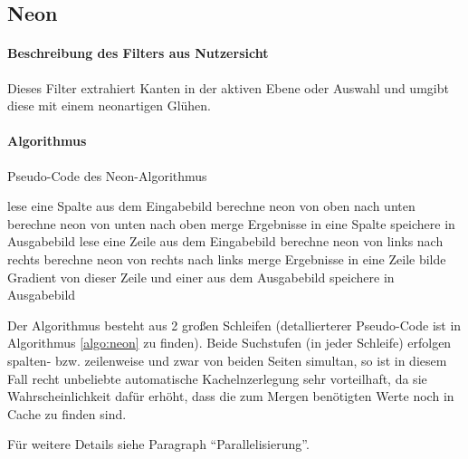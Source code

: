 \newpage
\subsection{Neon}

\paragraph{Beschreibung des Filters aus Nutzersicht}
Dieses Filter extrahiert Kanten in der aktiven Ebene oder Auswahl und 
umgibt diese mit einem neonartigen Glühen.








\paragraph{Algorithmus} 
\begin{algorithm}[h]
\caption{Pseudo-Code des \glqq Neon\grqq-Algorithmus}
\label{algo:neon}
\begin{algorithmic}[1]
	\State lese eine Spalte aus dem Eingabebild
		\State berechne neon von oben nach unten
	\EndFor
		\State berechne neon von unten nach oben
	\EndFor
	\State merge Ergebnisse in eine Spalte
	\State speichere in Ausgabebild
\EndFor	
{}
	\State lese eine Zeile aus dem Eingabebild
		\State berechne neon von links nach rechts
	\EndFor
		\State berechne neon von rechts nach links
	\EndFor	
	\State merge Ergebnisse in eine Zeile
	\State \label{neon_datenabhaengigkeit} bilde Gradient von dieser Zeile und einer aus dem Ausgabebild
	\State speichere in Ausgabebild
\EndFor
\end{algorithmic}
\end{algorithm}

Der Algorithmus besteht aus 2 großen Schleifen (detallierterer Pseudo-Code 
ist in Algorithmus \ref{algo:neon} zu finden).
Beide Suchstufen (in jeder Schleife) erfolgen spalten- bzw. zeilenweise und zwar von beiden Seiten simultan,
so ist in diesem Fall recht unbeliebte automatische Kachelnzerlegung sehr vorteilhaft, da sie Wahrscheinlichkeit dafür erhöht, dass die zum Mergen benötigten Werte noch in Cache zu finden sind.

Für weitere Details siehe Paragraph ``Parallelisierung''.



